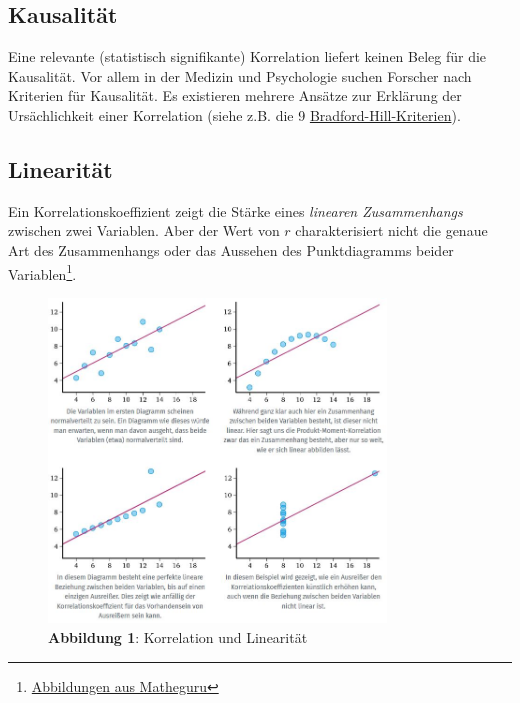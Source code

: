 \documentclass[]{article}
\let\rmarkdownfootnote\footnote%
\def\footnote{\protect\rmarkdownfootnote}
\begin{document}
\subsection*{Kausalität}\label{kausalitat}

Eine relevante (statistisch signifikante) Korrelation liefert keinen
Beleg für die Kausalität. Vor allem in der Medizin und Psychologie
suchen Forscher nach Kriterien für Kausalität. Es existieren mehrere
Ansätze zur Erklärung der Ursächlichkeit einer Korrelation (siehe z.B.
die 9
\href{https://de.wikipedia.org/wiki/\%C3\%84tiologie_(Medizin)}{Bradford-Hill-Kriterien}).

\subsection*{Linearität}\label{linearitat}

Ein Korrelationskoeffizient zeigt die Stärke eines \emph{linearen
Zusammenhangs} zwischen zwei Variablen. Aber der Wert von \(r\)
charakterisiert nicht die genaue Art des Zusammenhangs oder das Aussehen
des Punktdiagramms beider Variablen\footnote{\href{https://matheguru.com/stochastik/korrelation-korrelationskoeffizient.html}{Abbildungen
  aus Matheguru}}.

\begin{figure}
\centering
\includegraphics[width=0.80000\textwidth]{Images/03_LinearitaetKorrelation.JPG}
\caption{\textbf{Abbildung 1}: Korrelation und Linearität}
\end{figure}
\end{document}
